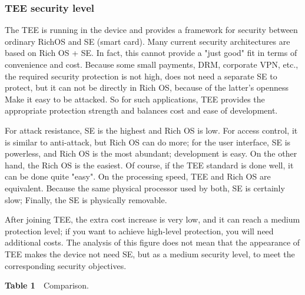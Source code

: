 \documentclass[journal]{IEEEtran}
\begin{document}
\subsubsection{TEE security level}
The TEE is running in the device and provides a framework for security between ordinary RichOS and SE (smart card). Many current security architectures are based on Rich OS + SE. In fact, this cannot provide a "just good" fit in terms of convenience and cost. Because some small payments, DRM, corporate VPN, etc., the required security protection is not high, does not need a separate SE to protect, but it can not be directly in Rich OS, because of the latter's openness Make it easy to be attacked. So for such applications, TEE provides the appropriate protection strength and balances cost and ease of development.

For attack resistance, SE is the highest and Rich OS is low. For access control, it is similar to anti-attack, but Rich OS can do more; for the user interface, SE is powerless, and Rich OS is the most abundant; development is easy. On the other hand, the Rich OS is the easiest. Of course, if the TEE standard is done well, it can be done quite "easy". On the processing speed, TEE and Rich OS are equivalent. Because the same physical processor used by both, SE is certainly slow; Finally, the SE is physically removable.

After joining TEE, the extra cost increase is very low, and it can reach a medium protection level; if you want to achieve high-level protection, you will need additional costs. The analysis of this figure does not mean that the appearance of TEE makes the device not need SE, but as a medium security level, to meet the corresponding security objectives.
\\
\begin{center}
\textbf{Table 1}~~Comparison.\\
\end{center}
\end{document}
